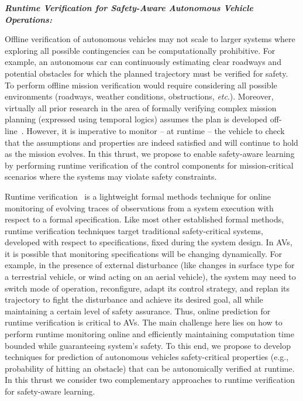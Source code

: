 \noindent\textbf{\em Runtime Verification for Safety-Aware Autonomous Vehicle Operations:} 

Offline verification of autonomous vehicles may not scale to larger systems where exploring all possible contingencies can be computationally prohibitive. 
For example, an autonomous car can continuously estimating clear roadways and potential obstacles for which the planned trajectory must be verified for safety. To perform offline mission verification would require considering all possible environments (roadways, weather conditions, obstructions, \emph{etc}.).  Moreover, virtually all prior research in the area of formally verifying complex mission planning (expressed using temporal logics) assumes the plan is developed off-line~\cite{saha2014automated,fainekos2005temporal,kress2009temporal}.  However, it is imperative to monitor -- at runtime -- the vehicle to check that the assumptions and properties are indeed satisfied and will continue to hold as the mission evolves. In this thrust, we propose to enable safety-aware learning by performing runtime verification of the control components for mission-critical scenarios where the systems may violate safety constraints.


 Runtime verification~\cite{SHL12} is a lightweight formal methods technique for online monitoring of evolving traces of observations from a system execution with respect to a formal specification.  Like most other established formal methods, runtime verification techniques target traditional safety-critical systems, developed with respect to specifications, fixed during the system design.  In AVs, it is possible that monitoring specifications will be changing dynamically.  For example, in the presence of external disturbance (like changes in surface type for a terrestrial vehicle, or wind acting on an aerial vehicle), the system may need to switch mode of operation, reconfigure, adapt its control strategy, and replan its trajectory to fight the disturbance and achieve its desired goal, all while maintaining a certain level of safety assurance. Thus, online prediction for runtime verification is critical to AVs. The main challenge here lies on how to perform runtime monitoring online and efficiently maintaining computation time bounded while guaranteeing system's safety.   To this end, we propose to develop techniques for prediction of autonomous vehicles safety-critical properties (e.g., probability of hitting an obstacle) that can be autonomically verified at runtime.  In this thrust we consider two complementary approaches to runtime verification for safety-aware learning.


